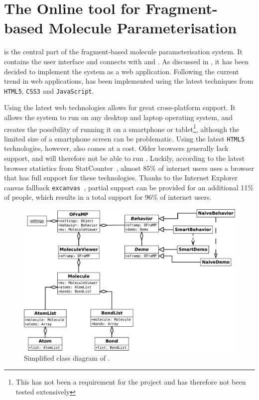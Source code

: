 \section[\oframp]{The Online tool for Fragment-based Molecule Parameterisation}
\oframp{} is the central part of the fragment-based molecule parameterisation system. It contains the user interface and connects with \oapoc{} and \omfraf{}. As discussed in , it has been decided to implement the system as a web application. Following the current trend in web applications, \oframp{} has been implemented using the latest techniques from \verb|HTML5|, \verb|CSS3| and \verb|JavaScript|.

Using the latest web technologies allows for great cross-platform support. It allows the system to run on any desktop and laptop operating system, and creates the possibility of running it on a smartphone or tablet\footnote{This has not been a requirement for the project and has therefore not been tested extensively}, although the limited size of a smartphone screen can be problematic. Using the latest \verb|HTML5| technologies, however, also comes at a cost. Older browsers generally lack support, and will therefore not be able to run \oframp. Luckily, according to the latest browser statistics from StatCounter~\cite{statcounter2014statcounter}, almost 85\% of internet users uses a browser that has full support for these technologies. Thanks to the Internet Explorer canvas fallback \verb|excanvas|~\cite{arvidsson2009explorercanvas}, partial support can be provided for an additional 11\% of people, which results in a total support for 96\% of internet users.

\nlipsum

\begin{figure}[h!]
\begin{center}
\includegraphics[width=\textwidth]{img/oframp_class.pdf}
\caption{Simplified class diagram of \oframp.}
\end{center}
\end{figure}

